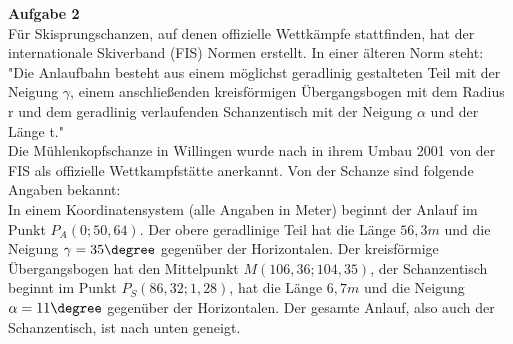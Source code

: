 	\textbf{Aufgabe 2}\\[0,2cm]		%
	Für Skisprungschanzen, auf denen offizielle Wettkämpfe stattfinden, hat der internationale Skiverband (FIS) Normen erstellt. In einer älteren Norm steht:\\
	"Die Anlaufbahn besteht aus einem möglichst geradlinig gestalteten Teil mit der Neigung $\gamma$, einem anschließenden kreisförmigen Übergangsbogen mit dem Radius r und dem geradlinig verlaufenden Schanzentisch mit der Neigung $\alpha$ und der Länge t."\\[0,2cm]
	Die Mühlenkopfschanze in Willingen wurde nach in ihrem Umbau 2001 von der FIS als offizielle Wettkampfstätte anerkannt. Von der Schanze sind folgende Angaben bekannt:\\
	In einem Koordinatensystem (alle Angaben in Meter) beginnt der Anlauf im Punkt \(P_A(0;50,64)\). Der obere geradlinige Teil hat die Länge $56,3m$ und die Neigung $\gamma=35\degree$ gegenüber der Horizontalen. Der kreisförmige Übergangsbogen hat den Mittelpunkt $M(106,36;104,35)$, der Schanzentisch beginnt im Punkt \(P_S(86,32;1,28)\), hat die Länge $6,7m$ und die Neigung $\alpha=11\degree$ gegenüber der Horizontalen. Der gesamte Anlauf, also auch der Schanzentisch, ist nach unten geneigt.
